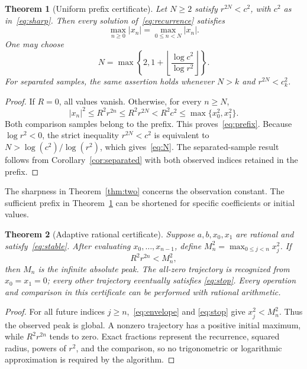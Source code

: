 \documentclass[11pt,a4paper]{article}
\newtheorem{theorem}{Theorem}\newtheorem{proposition}[theorem]{Proposition}\newtheorem{lemma}[theorem]{Lemma}\newtheorem{corollary}[theorem]{Corollary}\theoremstyle{definition}\newtheorem{definition}[theorem]{Definition}\newtheorem{example}[theorem]{Example}
\begin{document}
\begin{theorem}[Uniform prefix certificate]\label{thm:prefix}
Let $N\ge2$ satisfy $r^{2N}<c^2$, with $c^2$ as in~\eqref{eq:sharp}.
Then every solution of~\eqref{eq:recurrence} satisfies
\begin{equation}\label{eq:prefix}
 \boxed{\max_{n\ge0}|x_n|=\max_{0\le n<N}|x_n|.}
\end{equation}
One may choose
\begin{equation}\label{eq:N}
 N=\max\left\{2,1+\left\lfloor
             \frac{\log c^2}{\log r^2}\right\rfloor\right\}.
\end{equation}
For separated samples, the same assertion holds whenever $N>k$ and
$r^{2N}<c_k^2$.
\end{theorem}
\begin{proof}
If $R=0$, all values vanish. Otherwise, for every $n\ge N$,
\[
 |x_n|^2\le R^2r^{2n}\le R^2r^{2N}<R^2c^2
 \le\max\{x_0^2,x_1^2\}.
\]
Both comparison samples belong to the prefix. This proves~\eqref{eq:prefix}.
Because $\log r^2<0$, the strict inequality $r^{2N}<c^2$ is equivalent
to $N>\log(c^2)/\log(r^2)$, which gives~\eqref{eq:N}.
The separated-sample result follows from Corollary~\ref{cor:separated}
with both observed indices retained in the prefix.
\end{proof}

The sharpness in Theorem~\ref{thm:two} concerns the observation constant.
The sufficient prefix in Theorem~\ref{thm:prefix} can be shortened for
specific coefficients or initial values.

\begin{theorem}[Adaptive rational certificate]\label{thm:adaptive}
Suppose $a,b,x_0,x_1$ are rational and satisfy~\eqref{eq:stable}.
After evaluating $x_0,\ldots,x_{n-1}$, define
$M_n^2=\max_{0\le j<n}x_j^2$. If
\begin{equation}\label{eq:stop}
 R^2r^{2n}<M_n^2,
\end{equation}
then $M_n$ is the infinite absolute peak. The all-zero trajectory is
recognized from $x_0=x_1=0$; every other trajectory eventually satisfies
\eqref{eq:stop}. Every operation and comparison in this certificate can be
performed with rational arithmetic.
\end{theorem}
\begin{proof}
For all future indices $j\ge n$,~\eqref{eq:envelope} and
\eqref{eq:stop} give $x_j^2<M_n^2$. Thus the observed peak is global.
A nonzero trajectory has a positive initial maximum, while $R^2r^{2n}$
tends to zero. Exact fractions represent the recurrence, squared radius,
powers of $r^2$, and the comparison, so no trigonometric or logarithmic
approximation is required by the algorithm.
\end{proof}
\end{document}
